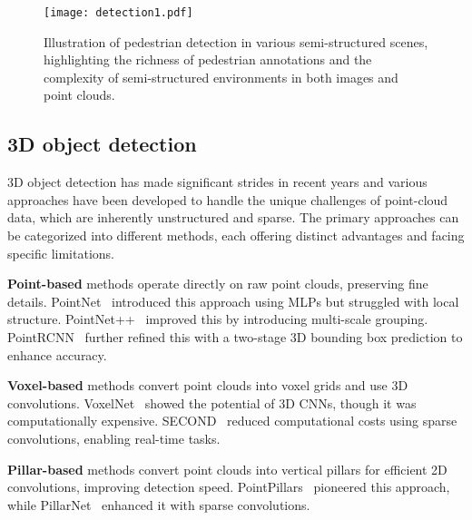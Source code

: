 \begin{figure}[t!]
    \centering
    \texttt{[image: detection1.pdf]}
    \caption{Illustration of pedestrian detection in various semi-structured scenes, highlighting the richness of pedestrian annotations and the complexity of semi-structured environments in both images and point clouds.}
    \label{fig:detection}
\end{figure}

\subsection{3D object detection}

3D object detection has made significant strides in recent years and various approaches have been developed to handle the unique challenges of point-cloud data, which are inherently unstructured and sparse. The primary approaches can be categorized into different methods, each offering distinct advantages and facing specific limitations. 

\textbf{Point-based} methods operate directly on raw point clouds, preserving fine details. PointNet~\cite{qi2017pointnet} introduced this approach using MLPs but struggled with local structure. PointNet++~\cite{qi2017pointnet++} improved this by introducing multi-scale grouping. PointRCNN~\cite{shi2019pointrcnn} further refined this with a two-stage 3D bounding box prediction to enhance accuracy.

\textbf{Voxel-based} methods convert point clouds into voxel grids and use 3D convolutions. VoxelNet~\cite{zhou2018voxelnet} showed the potential of 3D CNNs, though it was computationally expensive. SECOND~\cite{yan2018second} reduced computational costs using sparse convolutions, enabling real-time tasks.

\textbf{Pillar-based} methods convert point clouds into vertical pillars for efficient 2D convolutions, improving detection speed. PointPillars~\cite{lang2019pointpillars} pioneered this approach, while PillarNet~\cite{qi2017pointnet} enhanced it with sparse convolutions.